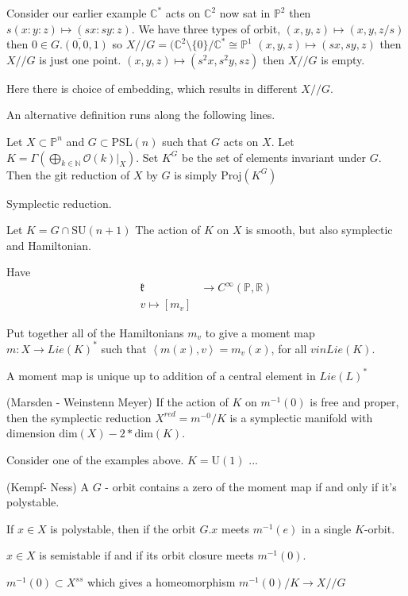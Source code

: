 Consider our earlier example $ \mathbb{C}  ^* $ acts on $ \mathbb{C} ^2 $ now sat in $ \mathbb{P} ^2$
then 
$s(x:y:z) \mapsto ( sx: sy: z) $. 
We have three types of orbit, 
$(x,y,z) \mapsto (x,y,z/s) $ then $ 0 \in \overline{G . ( 0,0,1) } $ so $ X// G = (\mathbb{C} ^2 \setminus \{0\} / \mathbb{C} ^* \cong \mathbb{P} ^1 $
$(x,y,z) \mapsto (sx,sy,z) $ then $ X// G $ is just one point.
$(x,y,z) \mapsto (s^2x,s^2 y, sz) $ then $ X// G $ is empty.

Here there is choice of embedding, which results in different $X//G$. 

An alternative definition runs along the following lines. 

Let $X \subset \mathbb{P} ^n $ and $ G \subset \mathrm{PSL} (n) $ such that $ G $ acts on $ X $.
Let $ K = \Gamma (\bigoplus_{k \in \mathbb{N} }  \mathcal{O}(k)|_X  ) $. 
Set $ K ^G $ be the set of elements invariant under $G$. 
Then the git reduction of $ X$ by $G$ is simply $ \mathrm{Proj}(K^G)$ 


Symplectic reduction. 

Let $ K = G \cap \mathrm{SU}(n+1) $ 
The action of $ K $ on $ X$ is smooth, but also symplectic and Hamiltonian. 

Have 
\begin{align}
    \mathfrak{k} & \rightarrow  C^\infty ( \mathbb{P} , \mathbb{R} ) \\
    v \mapsto [ m_v] 
\end{align}

Put together all of the Hamiltonians $ m_v $ to give a moment map $ m : X \rightarrow  Lie(K) ^* $
such that $\left< m(x) , v \right> = m_v(x) $, for all $ v in Lie (K) $. 

A moment map is unique up to addition of a central element in $Lie (L) ^*$ 

\begin{theorem}
 
    (Marsden - Weinstenn Meyer) 
    If the action of $K$ on $m^{-1}(0) $ is free and proper, 
    then the symplectic reduction $ X ^{red} = m^{-0} /K $ 
    is a symplectic manifold with dimension $ \mathrm{dim}(X) - 2 * \mathrm{dim}(K) $. 
\end{theorem}


Consider one of the examples above. 
$K = \mathrm{U} (1) $ ...

\begin{theorem}
 (Kempf- Ness) 
    A $ G $ - orbit contains a zero of the moment map if and only if it's polystable. 

    If $ x \in X $ is polystable, then if the orbit $ G . x $ meets $ m^{-1} (e) $ in a single $K$-orbit.

    $x \in X $ is semistable if and if its orbit closure meets $ m^{-1} (0) $. 

    $m^{-1} ( 0) \subset X ^{ss} $ which gives a homeomorphism 
    $m^{-1} (0) / K \rightarrow X//G $
\end{theorem}


